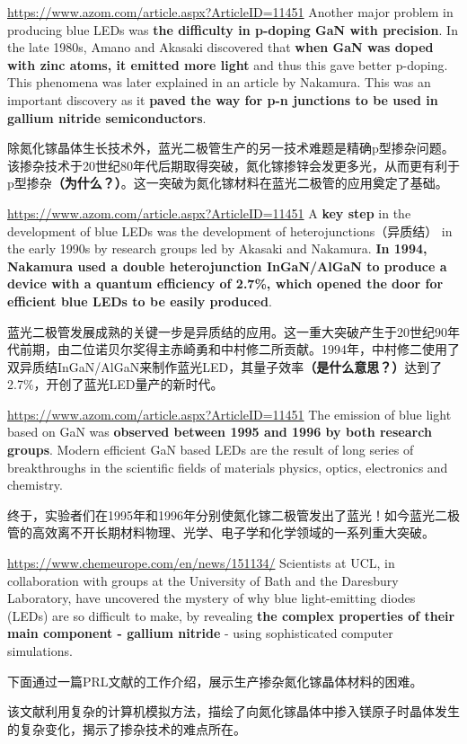 \documentclass{beamer}
\newenvironment{slide}{
    \begin{frame}{\bfseries{\sectiontitle}}
}{
    \end{frame}
}
\begin{document}
\begin{slide}{\url{https://www.azom.com/article.aspx?ArticleID=11451}}
    Another major problem in producing blue LEDs was \textbf{the difficulty in p-doping GaN with precision}. In the late 1980s, Amano and Akasaki discovered that \textbf{when GaN was doped with zinc atoms, it emitted more light} and thus this gave better p-doping. This phenomena was later explained in an article by Nakamura. This was an important discovery as it \textbf{paved the way for p-n junctions to be used in gallium nitride semiconductors}.
    \bigskip

    除氮化镓晶体生长技术外，蓝光二极管生产的另一技术难题是精确p型掺杂问题。该掺杂技术于20世纪80年代后期取得突破，氮化镓掺锌会发更多光，从而更有利于p型掺杂\textbf{（为什么？）}。这一突破为氮化镓材料在蓝光二极管的应用奠定了基础。
\end{slide}

\begin{slide}{\url{https://www.azom.com/article.aspx?ArticleID=11451}}
    A \textbf{key step} in the development of blue LEDs was the development of heterojunctions（异质结） in the early 1990s by research groups led by Akasaki and Nakamura. \textbf{In 1994, Nakamura used a double heterojunction InGaN/AlGaN to produce a device with a quantum efficiency of 2.7\%, which opened the door for efficient blue LEDs to be easily produced}.
    \bigskip

    蓝光二极管发展成熟的关键一步是异质结的应用。这一重大突破产生于20世纪90年代前期，由二位诺贝尔奖得主赤崎勇和中村修二所贡献。1994年，中村修二使用了双异质结InGaN/AlGaN来制作蓝光LED，其量子效率\textbf{（是什么意思？）}达到了2.7\%，开创了蓝光LED量产的新时代。
\end{slide}

\begin{slide}{\url{https://www.azom.com/article.aspx?ArticleID=11451}}
    The emission of blue light based on GaN was \textbf{observed between 1995 and 1996 by both research groups}. Modern efficient GaN based LEDs are the result of long series of breakthroughs in the scientific fields of materials physics, optics, electronics and chemistry.
    \bigskip

    终于，实验者们在1995年和1996年分别使氮化镓二极管发出了蓝光！如今蓝光二极管的高效离不开长期材料物理、光学、电子学和化学领域的一系列重大突破。
\end{slide}

\begin{slide}{\url{https://www.chemeurope.com/en/news/151134/}}
    Scientists at UCL, in collaboration with groups at the University of Bath and the Daresbury Laboratory, have uncovered the mystery of why blue light-emitting diodes (LEDs) are so difficult to make, by revealing \textbf{the complex properties of their main component - gallium nitride} - using sophisticated computer simulations.
    \bigskip

    下面通过一篇PRL文献的工作介绍，展示生产掺杂氮化镓晶体材料的困难。
    \medskip
    
    该文献利用复杂的计算机模拟方法，描绘了向氮化镓晶体中掺入镁原子时晶体发生的复杂变化，揭示了掺杂技术的难点所在。
\end{slide}
\end{document}

